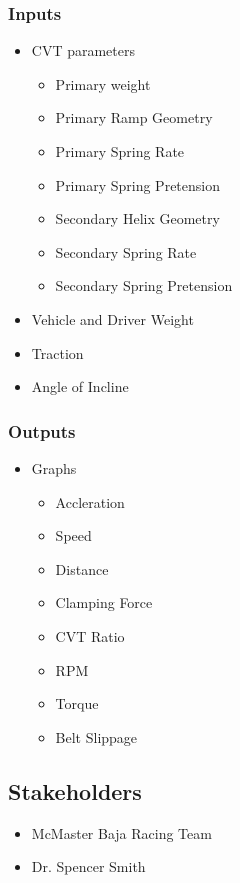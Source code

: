 \documentclass{article}
\begin{document}
\subsubsection{Inputs}
\begin{itemize}
    \item CVT parameters
    \begin{itemize}
        \item Primary weight
        \item Primary Ramp Geometry
        \item Primary Spring Rate
        \item Primary Spring Pretension
        \item Secondary Helix Geometry
        \item Secondary Spring Rate
        \item Secondary Spring Pretension
    \end{itemize}
    \item Vehicle and Driver Weight
    \item Traction
    \item Angle of Incline
\end{itemize}
\subsubsection{Outputs}
\begin{itemize}
    \item Graphs
    \begin{itemize}
        \item Accleration
        \item Speed
        \item Distance
        \item Clamping Force
        \item CVT Ratio
        \item RPM
        \item Torque
        \item Belt Slippage
    \end{itemize}
\end{itemize}

\subsection{Stakeholders}
\begin{itemize}
    \item McMaster Baja Racing Team
    \item Dr. Spencer Smith
\end{itemize}
\end{document}
